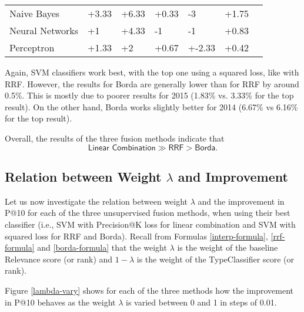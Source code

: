 \begin{table}
{\begin{tabular}{@{}lllllll@{}}
Naive Bayes                                              & +3.33           & +6.33              & +0.33           & -3                & +1.75          \\
Neural Networks                                         & +1              & +4.33              & -1             & -1                & +0.83          \\
Perceptron                                              & +1.33           & +2                 & +0.67           & +-2.33             & +0.42         \\\bottomrule
\end{tabular}%
}
\end{table}

Again, SVM classifiers work best, with the top one using a squared loss, like with RRF.
However, the results for Borda are generally lower than for RRF by around 0.5\%. This is mostly due
to poorer results for 2015 (1.83\% vs. 3.33\% for the top result).
On the other hand, Borda works slightly better for 2014 (6.67\% vs 6.16\% for the top result).

Overall, the results of the three fusion methods indicate that \[\textsf{Linear Combination} \gg \textsf{RRF} > \textsf{Borda}.\]

\subsection{Relation between Weight $\lambda$ and Improvement}
Let us now investigate the relation between weight $\lambda$ and the improvement in P@10 for each of the three unsupervised
fusion methods, when using their best classifier (i.e., SVM with Precision@K loss for linear combination
and SVM with squared loss for RRF and Borda).
Recall from Formulas \ref{interp-formula}, \ref{rrf-formula} and \ref{borda-formula} that the weight $\lambda$ is the
weight of the baseline \textsf{Relevance} score (or rank) and $1-\lambda$ is the weight of the \textsf{TypeClassifier} score (or rank).

Figure \ref{lambda-vary} shows for each of the three methods
how the improvement in P@10 behaves as the weight $\lambda$ is varied between 0 and 1 in steps of 0.01.

